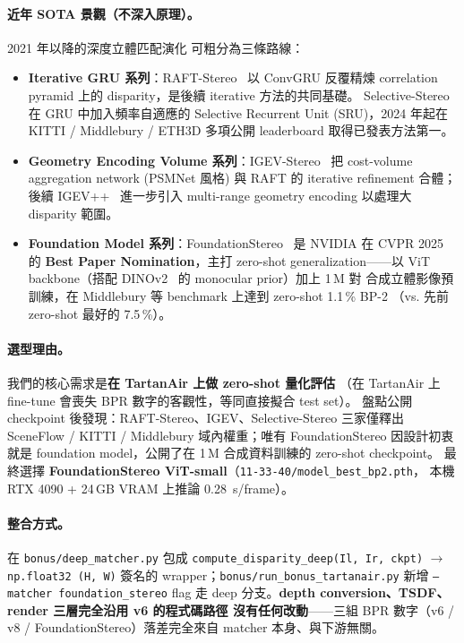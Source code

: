 \documentclass[11pt,a4paper]{article}
\begin{document}
\paragraph{近年 SOTA 景觀（不深入原理）。} 2021 年以降的深度立體匹配演化
可粗分為三條路線：
\begin{itemize}[leftmargin=2em,itemsep=2pt]
\item \textbf{Iterative GRU 系列}：RAFT-Stereo~\cite{Lipson2021} 以 ConvGRU 反覆精煉
correlation pyramid 上的 disparity，是後續 iterative 方法的共同基礎。
Selective-Stereo~\cite{Wang2024Selective} 在 GRU 中加入頻率自適應的 Selective
Recurrent Unit (SRU)，2024 年起在 KITTI / Middlebury / ETH3D 多項公開
leaderboard 取得已發表方法第一。
\item \textbf{Geometry Encoding Volume 系列}：IGEV-Stereo~\cite{Xu2023} 把 cost-volume
aggregation network (PSMNet 風格) 與 RAFT 的 iterative refinement 合體；後續
IGEV++~\cite{Xu2025} 進一步引入 multi-range geometry encoding 以處理大 disparity 範圍。
\item \textbf{Foundation Model 系列}：FoundationStereo~\cite{Wen2025} 是 NVIDIA
在 CVPR 2025 的 \textbf{Best Paper Nomination}，主打 zero-shot generalization——以
ViT backbone（搭配 DINOv2~\cite{Oquab2023} 的 monocular prior）加上 1\,M 對
合成立體影像預訓練，在 Middlebury 等 benchmark 上達到 zero-shot 1.1\,\% BP-2
（vs. 先前 zero-shot 最好的 7.5\,\%）。
\end{itemize}

\paragraph{選型理由。} 我們的核心需求是\textbf{在 TartanAir 上做 zero-shot 量化評估}
（在 TartanAir 上 fine-tune 會喪失 BPR 數字的客觀性，等同直接擬合 test set）。
盤點公開 checkpoint 後發現：RAFT-Stereo、IGEV、Selective-Stereo 三家僅釋出
SceneFlow / KITTI / Middlebury 域內權重；唯有 FoundationStereo 因設計初衷
就是 foundation model，公開了在 1\,M 合成資料訓練的 zero-shot checkpoint。
最終選擇 \textbf{FoundationStereo ViT-small}（\texttt{11-33-40/model\_best\_bp2.pth}，
本機 RTX 4090 + 24\,GB VRAM 上推論 \SI{0.28}{\second/frame}）。

\paragraph{整合方式。} 在 \texttt{bonus/deep\_matcher.py} 包成
\texttt{compute\_disparity\_deep(Il, Ir, ckpt)} $\to$ \texttt{np.float32 (H, W)} 簽名的
wrapper；\texttt{bonus/run\_bonus\_tartanair.py} 新增 \texttt{--matcher foundation\_stereo}
flag 走 deep 分支。\textbf{depth conversion、TSDF、render 三層完全沿用 v6 的程式碼路徑
沒有任何改動}——三組 BPR 數字（v6 / v8 / FoundationStereo）落差完全來自 matcher
本身、與下游無關。
\end{document}
